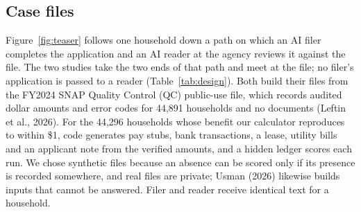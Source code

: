 \documentclass[sigconf,nonacm,screen]{acmart}
\begin{document}
\subsection{Case files}
Figure~\ref{fig:teaser} follows one household down a path on which an AI filer completes the application and an AI reader at the agency reviews it against the file. The two studies take the two ends of that path and meet at the file; no filer's application is passed to a reader (Table~\ref{tab:design}). Both build their files from the FY2024 SNAP Quality Control (QC) public-use file, which records audited dollar amounts and error codes for 44,891 households and no documents (Leftin et al., 2026). For the 44,296 households whose benefit our calculator reproduces to within \$1, code generates pay stubs, bank transactions, a lease, utility bills and an applicant note from the verified amounts, and a hidden ledger scores each run. We chose synthetic files because an absence can be scored only if its presence is recorded somewhere, and real files are private; Usman (2026) likewise builds inputs that cannot be answered. Filer and reader receive identical text for a household.
\end{document}
